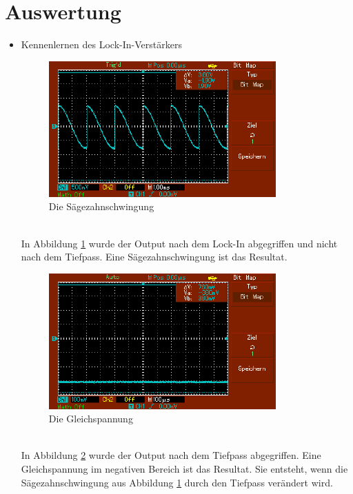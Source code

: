 \documentclass[captions=tableheading]{scrartcl}
\begin{document}
\section{Auswertung}
    \begin{itemize}
        \item{Kennenlernen des Lock-In-Verstärkers \\}
            \begin{figure}
                \centering
                \includegraphics{Lock_In Bilder/Aufgabe 1/MAP001.pdf}
                \caption{Die Sägezahnschwingung}
                \label{fig:sawsig}
            \end{figure}
            \\
            In Abbildung \ref{fig:sawsig} wurde der Output nach dem Lock-In abgegriffen und nicht nach dem Tiefpass.
            Eine Sägezahnschwingung ist das Resultat. 
            \\
            \begin{figure}
                \centering
                \includegraphics{Lock_In Bilder/Aufgabe 1/MAP002.pdf}
                \caption{Die Gleichspannung}
                \label{fig:flatsig}
            \end{figure}
            \\
            In Abbildung \ref{fig:flatsig} wurde der Output nach dem Tiefpass abgegriffen.
            Eine Gleichspannung im negativen Bereich ist das Resultat.
            Sie entsteht, wenn die Sägezahnschwingung aus Abbildung \ref{fig:sawsig} durch den Tiefpass verändert wird.

\end{itemize}
\end{document}
